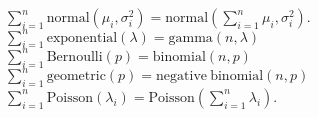  $\sum^n_{i=1} \mathrm{normal}(\mu_i,\sigma^2_i) = \mathrm{normal}(\sum^n_{i=1}\mu_i,\sigma^2_i)$.
$\sum^n_{i=1} \mathrm{exponential}(\lambda) = \mathrm{gamma}(n,\lambda)$
$\sum^n_{i=1} \mathrm{Bernoulli}(p) = \mathrm{binomial}(n,p)$
$\sum^n_{i=1} \mathrm{geometric}(p) = \mathrm{negative\ binomial}(n,p)$
$\sum^n_{i=1} \mathrm{Poisson}(\lambda_i) = \mathrm{Poisson}(\sum^n_{i=1}\lambda_i)$.